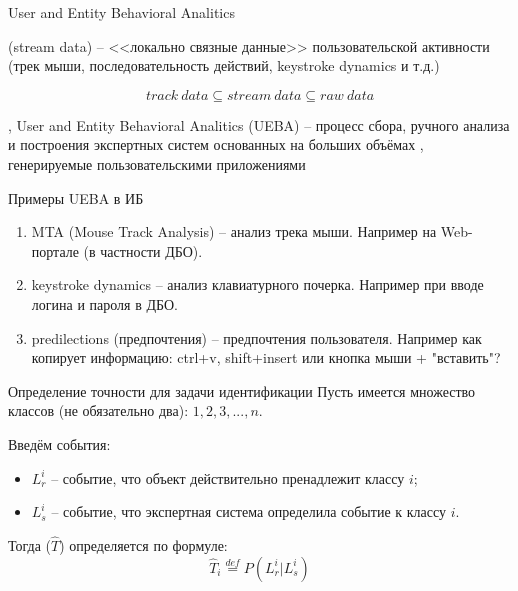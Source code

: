 \begin{frame}{User and Entity Behavioral Analitics}

	 (stream data) -- 
	<<локально связные данные>> пользовательской активности
	(трек мыши, последовательность действий, keystroke dynamics и т.д.)
	
	\begin{equation*}
	track~data \subseteq stream~data \subseteq raw~data
	\end{equation*}
	
	, User and Entity Behavioral Analitics (UEBA) --
	процесс сбора, ручного анализа и построения экспертных систем
	основанных на больших объёмах , генерируемые пользовательскими приложениями
\end{frame}

\begin{frame}{Примеры UEBA в ИБ}
	\begin{enumerate}
		\item MTA (Mouse Track Analysis) --
		анализ трека мыши.
		Например на Web-портале (в частности ДБО).
		\item keystroke dynamics --
		анализ клавиатурного почерка.
		Например при вводе логина и пароля в ДБО.
		\item predilections (предпочтения) --
		предпочтения пользователя. 
		Например как копирует информацию: ctrl+v, shift+insert или кнопка мыши + "вставить"?
	\end{enumerate}
\end{frame}

\begin{frame}{Определение точности для задачи идентификации}
	\small
	Пусть имеется множество классов (не обязательно два): $1, 2, 3, ..., n$.
	
	Введём события:
	\begin{itemize}
		\item $L_r^i$ -- событие, что объект действительно пренадлежит классу $i$;
		\item $L_s^i$ -- событие, что экспертная система определила событие к классу $i$.
	\end{itemize}
	
	Тогда  ($\hat T$)
	определяется по формуле:
	\begin{equation}\label{eq:ueba_self_presicion_def}
	\hat T_i \stackrel{def}{=} P (L_r^i | L_s^i)
	\end{equation}
\end{frame}

